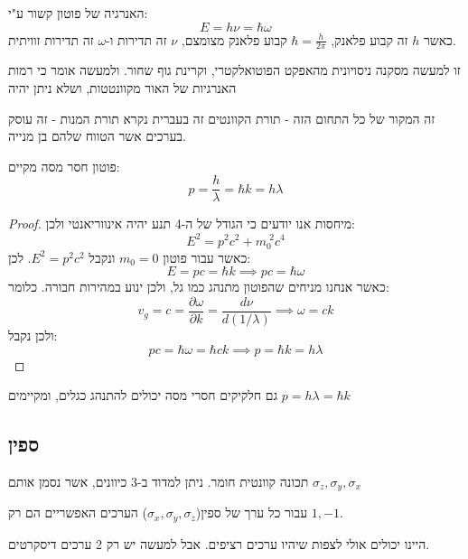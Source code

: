 \documentclass{tstextbook}
\begin{document}
\begin{theorem}
האנרגיה של פוטון קשור ע"י:
$$E = h \nu = \hbar \omega$$
כאשר \(h\) זה קבוע פלאנק, \(\hbar=\frac{h}{2\pi}\) קבוע פלאנק מצומצם, \(\nu\) זה תדירות ו-\(\omega\) זה תדירות זוויתית.

\end{theorem}
\begin{remark}
זו למעשה מסקנה ניסויונית מהאפקט הפוטואלקטרי, וקרינת גוף שחור. ולמעשה אומר כי רמות האנרגיות של האור מקוונטטות, ושלא ניתן יהיה

\end{remark}
\begin{remark}
זה המקור של כל התחום הזה - תורת הקוונטים זה בעברית נקרא תורת המנות - זה עוסק בערכים אשר הטווח שלהם בן מנייה.

\end{remark}
\begin{proposition}
פוטון חסר מסה מקיים:
$$p=\frac{h}{\lambda}=\hbar k=h\lambda$$

\end{proposition}
\begin{proof}
מיחסות אנו יודעים כי הגודל של ה-4 תנע יהיה אינווריאנטי ולכן:
$$E^{2}=p^{2}c^{2}+m_{0}^{\,\,2}c^{4}$$
כאשר עבור פוטון \(m_{0}=0\) ונקבל \(E^2=p^2c^2\). לכן:
$$E=pc=\hbar k\implies pc=\hbar \omega$$
כאשר אנחנו מניחים שהפוטון מתנהג כמו גל, ולכן ינוע במהירות חבורה. כלומר:
$$v_{g}=c= {\frac{\partial\omega}{\partial k}}={\frac{d\nu}{d\left( 1/\lambda \right)}}\implies \omega=ck$$
ולכן נקבל:
$$pc=\hbar \omega=\hbar ck\implies p=\hbar k=h\lambda$$

\end{proof}
\begin{theorem}[דה ברויי]
גם חלקיקים חסרי מסה יכולים להתנהג כגלים, ומקיימים \(p=h\lambda=\hbar k\)

\end{theorem}
\subsection{ספין}

\begin{definition}[ספין]
תכונה קוונטית חומר. ניתן למדוד ב-3 כיוונים, אשר נסמן אותם \(\sigma_{z},\sigma_{y},\sigma_{x}\)

\end{definition}
\begin{proposition}
עבור כל ערך של ספין(\(\sigma _{x},\sigma_{y},\sigma_{z}\)) הערכים האפשריים הם רק \(1,-1\).

\end{proposition}
היינו יכולים אולי לצפות שיהיו ערכים רציפים. אבל למעשה יש רק 2 ערכים דיסקרטים.
\end{document}
